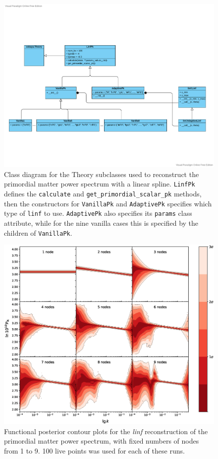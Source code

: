 \documentclass{article}
\begin{document}
\begin{figure}
  \centering
  \includegraphics[width=16cm]{Pk_linf.pdf}
  \caption{Class diagram for the Theory subclasses used to reconstruct the primordial matter power spectrum with a linear spline. \texttt{LinfPk} defines the \texttt{calculate} and \texttt{get\_primordial\_scalar\_pk} methods, then the constructors for \texttt{VanillaPk} and \texttt{AdaptivePk} specifies which type of \texttt{linf} to use. \texttt{AdaptivePk} also specifies its \texttt{params} class attribute, while for the nine vanilla cases this is specified by the children of \texttt{VanillaPk}.}
  \label{fig:PkUMLDiagram}
\end{figure}

\newpage

\begin{figure}[H]
  \centering
  \includegraphics[width=16cm]{vanilla100.eps}
  \caption{Functional posterior contour plots for the \textit{linf} reconstruction of the primordial matter power spectrum, with fixed numbers of nodes from 1 to 9. 100 live points was used for each of these runs.}
  \label{fig:Pk_vanilla_100}
\end{figure}
\end{document}
